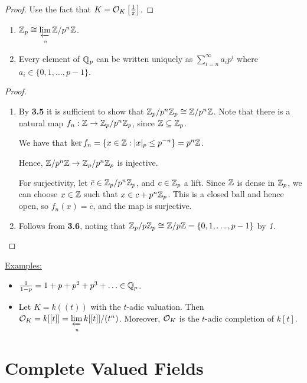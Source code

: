 \documentclass[10pt,a4paper]{article}
\begin{document}
\begin{proof}
  Use the fact that $K = \mathcal{O}_K\left[\frac{1}{\pi}\right]$.
\end{proof}
\begin{corollary}\hspace*{0cm}
  \begin{enumerate}
    \item $\mathbb{Z}_p \cong \lim\limits_{\xleftarrow[n]{}} \mathbb{Z}/p^n\mathbb{Z}$.
    \item Every element of $\mathbb{Q}_p$ can be written uniquely as $\sum_{i=n}^\infty a_i p^i$ where $a_i \in \{0, 1, \ldots, p-1\}$.
  \end{enumerate}
\end{corollary}
\begin{proof}\hspace*{0cm}
  \begin{enumerate}[label=\textit{\arabic*.}]
    \item By \textbf{3.5} it is sufficient to show that $\mathbb{Z}_p/p^n\mathbb{Z}_p \cong \mathbb{Z}/p^n\mathbb{Z}$. Note that there is a natural map $f_n : \mathbb{Z} \to \mathbb{Z}_p/p^n\mathbb{Z}_p$, since $\mathbb{Z} \subseteq \mathbb{Z}_p$.

    We have that $\ker f_n = \{x \in \mathbb{Z} : \lvert x\rvert_p \leq p^{-n}\} = p^n \mathbb{Z}$.

    Hence, $\mathbb{Z}/p^n\mathbb{Z} \to \mathbb{Z}_p/p^n\mathbb{Z}_p$ is injective.

    For surjectivity, let $\bar{c} \in \mathbb{Z}_p/p^n\mathbb{Z}_p$, and $c \in \mathbb{Z}_p$ a lift. Since $\mathbb{Z}$ is dense in $\mathbb{Z}_p$, we can choose $x \in \mathbb{Z}$ such that $x \in c + p^n\mathbb{Z}_p$. This is a closed ball and hence open, so $f_n(x) = \bar{c}$, and the map is surjective.

    \item Follows from \textbf{3.6}, noting that $\mathbb{Z}_p/p\mathbb{Z}_p \cong \mathbb{Z}/p\mathbb{Z} = \{0, 1, \ldots, p-1\}$ by \textit{1.}
  \end{enumerate}
\end{proof}

\underline{Examples:}
\begin{itemize}
  \item $\frac{1}{1-p} = 1 + p + p^2 + p^3 + \ldots \in \mathbb{Q}_p$.
  \item Let $K = k((t))$ with the $t$-adic valuation. Then $\mathcal{O}_K = k[[t]] = \lim\limits_{\xleftarrow[n]{}} k[[t]]/(t^n)$. Moreover, $\mathcal{O}_K$ is the $t$-adic completion of $k[t]$.
\end{itemize}
\section{Complete Valued Fields}
\end{document}
